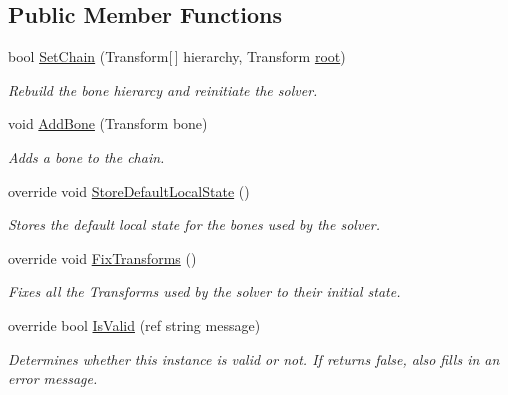 \subsection*{Public Member Functions}
\begin{DoxyCompactItemize}
\item 
bool \mbox{\hyperlink{class_root_motion_1_1_final_i_k_1_1_i_k_solver_heuristic_a3bc403bfbc0adc7dadd1367b46726669}{Set\+Chain}} (Transform\mbox{[}$\,$\mbox{]} hierarchy, Transform \mbox{\hyperlink{class_root_motion_1_1_final_i_k_1_1_i_k_solver_add558b38f163259934c37a0f1b497c06}{root}})
\begin{DoxyCompactList}\small\item\em Rebuild the bone hierarcy and reinitiate the solver. \end{DoxyCompactList}\item 
void \mbox{\hyperlink{class_root_motion_1_1_final_i_k_1_1_i_k_solver_heuristic_a034922fce9f0ca8db348f67c7c0101ce}{Add\+Bone}} (Transform bone)
\begin{DoxyCompactList}\small\item\em Adds a bone to the chain. \end{DoxyCompactList}\item 
override void \mbox{\hyperlink{class_root_motion_1_1_final_i_k_1_1_i_k_solver_heuristic_a58192848dbddf53c43c8ce54c3346557}{Store\+Default\+Local\+State}} ()
\begin{DoxyCompactList}\small\item\em Stores the default local state for the bones used by the solver. \end{DoxyCompactList}\item 
override void \mbox{\hyperlink{class_root_motion_1_1_final_i_k_1_1_i_k_solver_heuristic_a8cd9cbe3bd3bd871cc288e4ef7da4f33}{Fix\+Transforms}} ()
\begin{DoxyCompactList}\small\item\em Fixes all the Transforms used by the solver to their initial state. \end{DoxyCompactList}\item 
override bool \mbox{\hyperlink{class_root_motion_1_1_final_i_k_1_1_i_k_solver_heuristic_a81daa8bcbfe7cf858f2e439de4ade437}{Is\+Valid}} (ref string message)
\begin{DoxyCompactList}\small\item\em Determines whether this instance is valid or not. If returns false, also fills in an error message. \end{DoxyCompactList}\item 

\end{DoxyCompactItemize}
